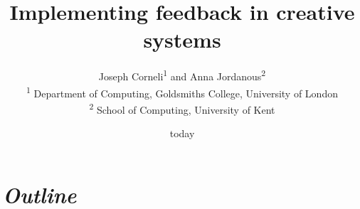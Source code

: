\documentclass[letter]{article}
\begin{document}
\title{Implementing feedback in creative systems}

\author{Joseph Corneli\textsuperscript{1} and Anna Jordanous\textsuperscript{2}\\
\textsuperscript{1} Department of Computing, Goldsmiths College, University of London\\
\textsuperscript{2} School of Computing, University of Kent}

\date{today}

\maketitle

\begin{abstract} 
\end{abstract}

\section*{\emph{Outline}} \label{sec:outline}
\end{document}
